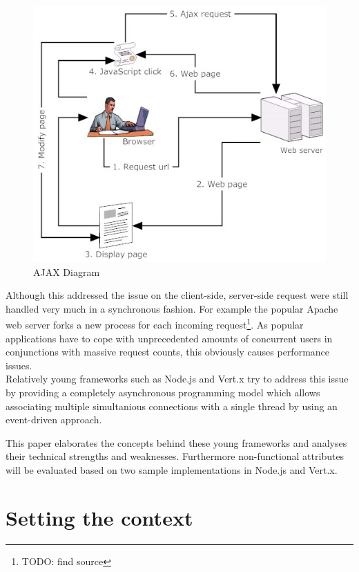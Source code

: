 \begin{figure}[hbtp]
\centering
\includegraphics[scale=0.5]{img/ajax-diagram}
\caption{AJAX Diagram\label{img_ajax}}
\end{figure}

Although this addressed the issue on the client-side, server-side request were
still handled very much in a synchronous fashion. For example the popular Apache
web server forks a new process for each incoming request\footnote{TODO: find
source}. As popular applications have to cope with unprecedented amounts of
concurrent users in conjunctions with massive request counts, this obviously
causes performance issues.\\

Relatively young frameworks such as Node.js and Vert.x try to address this issue 
by providing a completely asynchronous programming model which allows associating
multiple simultanious connections with a single thread by using an event-driven approach.

This paper elaborates the concepts behind these young frameworks and analyses their 
technical strengths and weaknesses. Furthermore non-functional attributes will be
evaluated based on two sample implementations in Node.js  and Vert.x.



\newpage
\section{Setting the context}
\label{setting_the_context}

